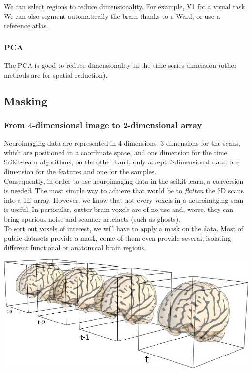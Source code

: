\documentclass{frontiersSCNS} %
\newcommand{\alex}[1]{\todo[inline, color=green!40]{#1}}
\begin{document}
We can select regions to reduce dimensionality. For example, V1 for a visual
task. We can also segment automatically the brain thanks to a Ward, or use a
reference atlas.

\subsubsection{PCA}

The PCA is good to reduce dimensionality in the time series dimension (other
methods are for spatial reduction).


\subsection{Masking}


\subsubsection{From 4-dimensional image to 2-dimensional array}

Neuroimaging data are represented in 4 dimensions: 3 dimensions for the scans,
which are positioned in a coordinate space, and one dimension for the time.
Scikit-learn algorithms, on the other hand, only accept 2-dimensional data: one
dimension for the features and one for the samples.\\

Consequently, in order to use neuroimaging data in the scikit-learn, a
conversion is needed. The most simple way to achieve that would be to
\emph{flatten} the 3D scans into a 1D array. However, we know that not every
voxels in a neuroimaging scan is useful. In particular, outter-brain voxels are
of no use and, worse, they can bring spurious noise and scanner artefacts (such
as ghosts).\\

To sort out voxels of interest, we will have to apply a mask on the data. Most
of public datasets provide a mask, come of them even provide several, isolating
different functional or anatomical brain regions. \alex{ref to Haxby}

\includegraphics[width=.5\linewidth]{img/niimgs.jpg}
\end{document}
